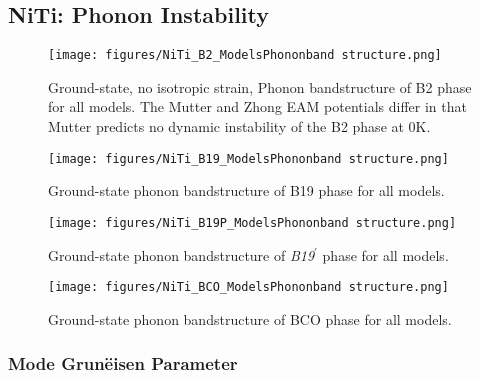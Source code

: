 \documentclass[preprint,colorlinks=true,linkcolor=black,citecolor=black]{elsarticle}
\begin{document}
\subsection{NiTi: Phonon Instability}
\label{subsec:nitiphonons}

\begin{figure}[!htp]
	\begin{centering}
		\texttt{[image: figures/NiTi\_B2\_ModelsPhononband structure.png]}
		\caption{ Ground-state, no isotropic strain, Phonon bandstructure
			of B2 phase for all models. The Mutter and Zhong EAM potentials
			differ in that Mutter predicts no dynamic instability of the B2
			phase at 0K.  }
		\label{fig:allmodels_b2}
	\end{centering}
\end{figure}

\begin{figure}[!htp]
	\begin{centering}
		\texttt{[image: figures/NiTi\_B19\_ModelsPhononband structure.png]}
		\caption{ Ground-state phonon bandstructure of B19 phase for all
			models.  }
		\label{fig:allmodels_B19P}
	\end{centering}
\end{figure}

\begin{figure}[!htp]
	\begin{centering}
		\texttt{[image: figures/NiTi\_B19P\_ModelsPhononband structure.png]}
		\caption{ Ground-state phonon bandstructure of
			\textit{B19}$^\prime$ phase for all models.  }
		\label{fig:allmodels_B19P}
	\end{centering}
\end{figure}

\begin{figure}[!htp]
	\begin{centering}
		\texttt{[image: figures/NiTi\_BCO\_ModelsPhononband structure.png]}
		\caption{ Ground-state phonon bandstructure of BCO phase for all
			models.  }
		\label{fig:allmodels_B19P}
	\end{centering}
\end{figure}

\subsubsection{Mode Grun\"{e}isen Parameter}
\end{document}
